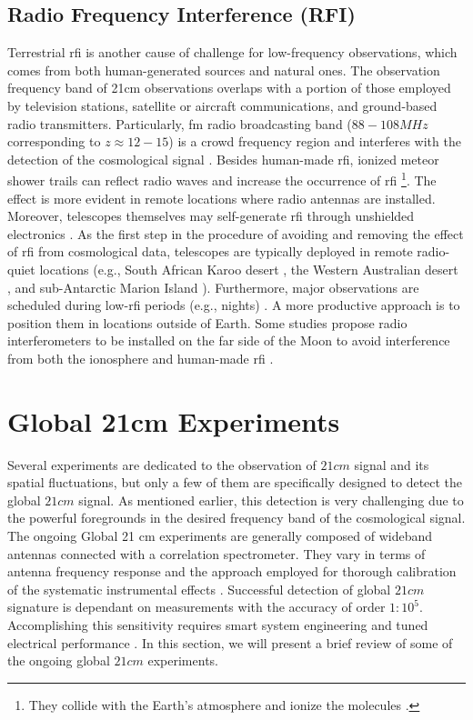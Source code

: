 \documentclass[12pt, TexShade, letterpaper]{report}
\begin{document}
\subsection{Radio Frequency Interference (RFI)}
Terrestrial \gls{rfi} is another cause of challenge for low-frequency observations, which comes from both human-generated sources and natural ones. The observation frequency band of 21cm observations overlaps with a portion of those employed by television stations, satellite or aircraft communications, and ground-based radio transmitters. Particularly, \gls{fm} radio broadcasting band ($88-108MHz$ corresponding to $z \approx 12-15$) is a crowd frequency region and interferes with the detection of the cosmological signal \cite{sci-hi_1}. 
Besides human-made \gls{rfi}, ionized meteor shower trails can reflect radio waves and increase the occurrence of \gls{rfi} \footnote{They collide with the Earth's atmosphere and ionize the molecules \cite{prizm_thesis}.}. The effect is more evident in remote locations where radio antennas are installed. Moreover, telescopes themselves may self-generate \gls{rfi} through unshielded electronics \cite{thesis_pamela}. 
As the first step in the procedure of avoiding and removing the effect of \gls{rfi} from cosmological data, telescopes are typically deployed in remote radio-quiet locations (e.g., South African Karoo desert \cite{reach_design}, the Western Australian desert \cite{edges}, and sub-Antarctic Marion Island \cite{prizm_2017, prizm_thesis, rfi_1}). Furthermore, major observations are scheduled during low-\gls{rfi} periods (e.g., nights) \cite{leda_design}. A more productive approach is to position them in locations outside of Earth. Some studies propose radio interferometers to be installed on the far side of the Moon \cite{lunar_far_side, global_moon_far_side} to avoid interference from both the ionosphere and human-made \gls{rfi} \cite{thesis_pamela}. \par
\section{Global 21cm Experiments}
Several experiments are dedicated to the observation of $21cm$ signal and its spatial fluctuations, but only a few of them are specifically designed to detect the global $21cm$ signal. As mentioned earlier, this detection is very challenging due to the powerful foregrounds in the desired frequency band of the cosmological signal. The ongoing Global 21 cm experiments are generally composed of wideband antennas connected with a correlation spectrometer. They vary in terms of antenna frequency response and the approach employed for thorough calibration of the systematic instrumental effects \cite{hyperion_1}. Successful detection of global $21cm$ signature is dependant on measurements with the accuracy of order $1:10^5$. Accomplishing this sensitivity requires smart system engineering and tuned electrical performance \cite{hyperion_2}. In this section, we will present a brief review of some of the ongoing global $21cm$ experiments.\par
\end{document}
